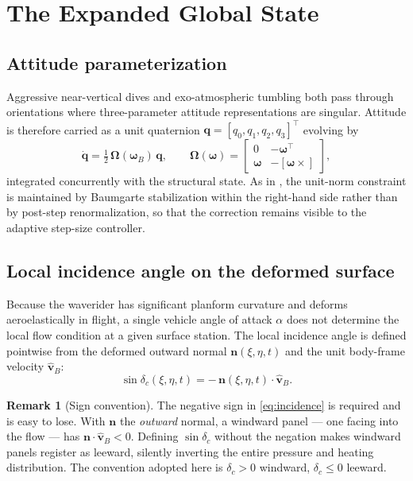 \documentclass[11pt,a4paper]{article}
\theoremstyle{definition}
\newtheorem{remark}[theorem]{Remark}
\numberwithin{equation}{section}
\begin{document}
\section{The Expanded Global State}
\label{sec:state}

\subsection{Attitude parameterization}
\label{sec:attitude}

Aggressive near-vertical dives and exo-atmospheric tumbling both pass through orientations where three-parameter attitude representations are singular. Attitude is therefore carried as a unit quaternion $\mathbf{q} = [q_0, q_1, q_2, q_3]^{\!\top}$ evolving by
\begin{equation}
\label{eq:quat}
\dot{\mathbf{q}} = \tfrac{1}{2}\,\bm{\Omega}(\bm{\omega}_B)\,\mathbf{q},
\qquad
\bm{\Omega}(\bm{\omega}) = \begin{bmatrix} 0 & -\bm{\omega}^{\!\top} \\ \bm{\omega} & -[\bm{\omega}\times] \end{bmatrix},
\end{equation}
integrated concurrently with the structural state. As in \cite{knox2026passes}, the unit-norm constraint is maintained by Baumgarte stabilization within the right-hand side rather than by post-step renormalization, so that the correction remains visible to the adaptive step-size controller.

\subsection{Local incidence angle on the deformed surface}
\label{sec:incidence}

Because the waverider has significant planform curvature and deforms aeroelastically in flight, a single vehicle angle of attack $\alpha$ does not determine the local flow condition at a given surface station. The local incidence angle is defined pointwise from the deformed outward normal $\mathbf{n}(\xi,\eta,t)$ and the unit body-frame velocity $\hat{\mathbf{v}}_B$:
\begin{equation}
\label{eq:incidence}
\sin \delta_c(\xi, \eta, t) = -\,\mathbf{n}(\xi, \eta, t) \cdot \hat{\mathbf{v}}_B .
\end{equation}

\begin{remark}[Sign convention]
\label{rem:sign}
The negative sign in \cref{eq:incidence} is required and is easy to lose. With $\mathbf{n}$ the \emph{outward} normal, a windward panel --- one facing into the flow --- has $\mathbf{n} \cdot \hat{\mathbf{v}}_B < 0$. Defining $\sin\delta_c$ without the negation makes windward panels register as leeward, silently inverting the entire pressure and heating distribution. The convention adopted here is $\delta_c > 0$ windward, $\delta_c \le 0$ leeward.
\end{remark}
\end{document}

